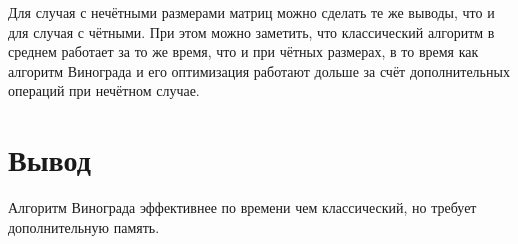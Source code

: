 Для случая с нечётными размерами матриц можно сделать те же выводы, что и для случая с чётными. При этом можно заметить, что классический алгоритм в среднем работает за то же время, что и при чётных размерах, в то время как алгоритм Винограда и его оптимизация работают дольше за счёт дополнительных операций при нечётном случае. 

\section*{Вывод}

Алгоритм Винограда эффективнее по времени чем классический, но требует дополнительную память.


